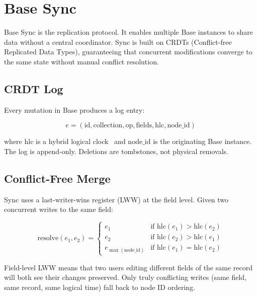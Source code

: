 \section{Base Sync}

\label{sec:sync}

Base Sync is the replication protocol. It enables multiple Base instances to
share data without a central coordinator. Sync is built on CRDTs
(Conflict-free Replicated Data Types), guaranteeing that concurrent
modifications converge to the same state without manual conflict resolution.

\subsection{CRDT Log}

Every mutation in Base produces a log entry:

\begin{equation}
e = (\text{id}, \text{collection}, \text{op}, \text{fields}, \text{hlc}, \text{node\_id})
\end{equation}

where $\text{hlc}$ is a hybrid logical clock~\cite{kulkarni2014hlc} and
$\text{node\_id}$ is the originating Base instance. The log is append-only.
Deletions are tombstones, not physical removals.

\subsection{Conflict-Free Merge}

Sync uses a last-writer-wins register (LWW) at the field level. Given two
concurrent writes to the same field:

\begin{equation}
\text{resolve}(e_1, e_2) =
\begin{cases}
e_1 & \text{if } \text{hlc}(e_1) > \text{hlc}(e_2) \\
e_2 & \text{if } \text{hlc}(e_2) > \text{hlc}(e_1) \\
e_{\max(\text{node\_id})} & \text{if } \text{hlc}(e_1) = \text{hlc}(e_2)
\end{cases}
\end{equation}

Field-level LWW means that two users editing different fields of the same
record will both see their changes preserved. Only truly conflicting writes
(same field, same record, same logical time) fall back to node ID ordering.

